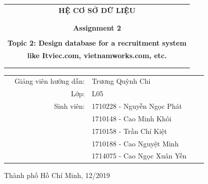 \begin{titlepage}
\begin{center}
\begin{tabular}{c}
\multicolumn{1}{c}{\textbf{{\Huge HỆ CƠ SỞ DỮ LIỆU}}}\\
\\ \hline \\
\textbf{{\Large Assignment 2}}\\
\\
\textbf{{\large Topic 2: Design database for a recruitment system}}\\
\textbf{{\large like Itviec.com, vietnamworks.com, etc. }}\\
\\ \hline \\
\end{tabular}
\end{center}
	\begin{table}[h]
	\begin{tabular}{rrlrr}
		\hspace{5cm} 
		& {\large Giảng viên hướng dẫn}: & {\large Trương Quỳnh Chi} & & \\
		& {\large Lớp}: & {\large L05} & & \\
		& {\large Sinh viên}: & {\large 1710228 - Nguyễn Ngọc Phát } \\
		& {} & {\large 1710148 - Cao Minh Khôi } \\
		& {} & {\large 1710158 - Trần Chí Kiệt } \\
		& {} & {\large 1710188 - Cao Nguyệt Minh} \\
		& {} & {\large 1714075 - Cao Ngọc Xuân Yến} \\
	\end{tabular}
\end{table}

\vspace{3cm}

\begin{center}
{\footnotesize Thành phố Hồ Chí Minh, 12/2019}
\end{center}

\end{titlepage}
